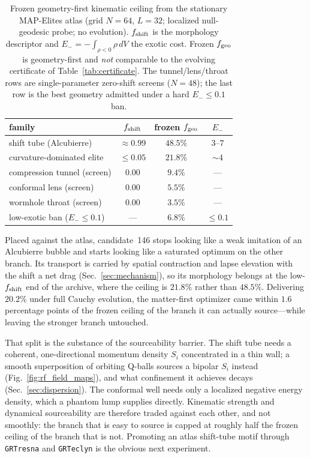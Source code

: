 \documentclass[twocolumn,floatfix,aps,prd,nofootinbib]{revtex4-2}
\begin{document}
\begin{table}[tbp]
\caption{Frozen geometry-first kinematic ceiling from the stationary
MAP-Elites atlas (grid $N=64$, $L=32$; localized null-geodesic probe; no
evolution). $f_{\rm shift}$ is the morphology descriptor and
$E_-=-\int_{\rho<0}\rho\,dV$ the exotic cost. Frozen $f_{\rm geo}$ is
geometry-first and \emph{not} comparable to the evolving certificate of
Table~\ref{tab:certificate}. The tunnel/lens/throat rows are single-parameter
zero-shift screens ($N=48$); the last row is the best geometry admitted under a
hard $E_-\le0.1$ ban.}
\label{tab:geometry_ceiling}
\begin{ruledtabular}
\begin{tabular}{lccc}
family & $f_{\rm shift}$ & frozen $f_{\rm geo}$ & $E_-$ \\
\hline
shift tube (Alcubierre)      & ${\approx}0.99$ & $48.5\%$ & $3$--$7$ \\
curvature-dominated elite    & ${\le}0.05$     & $21.8\%$ & ${\sim}4$ \\
compression tunnel (screen)  & $0.00$          & $9.4\%$  & --- \\
conformal lens (screen)      & $0.00$          & $5.5\%$  & --- \\
wormhole throat (screen)     & $0.00$          & $3.5\%$  & --- \\
low-exotic ban ($E_-\le0.1$) & ---             & $6.8\%$  & ${\le}0.1$ \\
\end{tabular}
\end{ruledtabular}
\end{table}

Placed against the atlas, candidate~146 stops looking like a weak imitation of
an Alcubierre bubble and starts looking like a saturated optimum on the other
branch. Its transport is carried by spatial contraction and lapse elevation
with the shift a net drag (Sec.~\ref{sec:mechanism}), so its morphology belongs
at the low-$f_{\rm shift}$ end of the archive, where the ceiling is $21.8\%$
rather than $48.5\%$. Delivering $20.2\%$ under full Cauchy evolution, the
matter-first optimizer came within $1.6$ percentage points of the frozen
ceiling of the branch it can actually source---while leaving the stronger
branch untouched.

That split is the substance of the sourceability barrier. The shift tube needs
a coherent, one-directional momentum density $S_i$ concentrated in a thin wall;
a smooth superposition of orbiting Q-balls sources a bipolar $S_i$ instead
(Fig.~\ref{fig:rf_field_maps}), and what confinement it achieves decays
(Sec.~\ref{sec:dispersion}). The conformal well needs only a localized negative
energy density, which a phantom lump supplies directly. Kinematic strength and
dynamical sourceability are therefore traded against each other, and not
smoothly: the branch that is easy to source is capped at roughly half the
frozen ceiling of the branch that is not. Promoting an atlas shift-tube motif
through \texttt{GRTresna} and \texttt{GRTeclyn} is the obvious next experiment.
\end{document}
